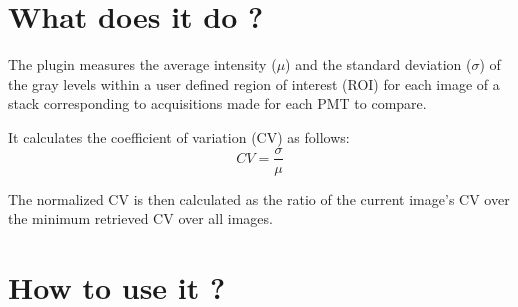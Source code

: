 \documentclass[a4paper, 11pt]{report}%
\begin{document}
\newpage

\section{What does it do ?}
\label{sec:gcvr-what}

\begin{enumerate*}
	\item The plugin measures the average intensity ($\mu$) and the standard deviation ($\sigma$) of the gray levels within a user defined region of interest (ROI) for each image of a stack corresponding to acquisitions made for each PMT to compare.
	\item It calculates the coefficient of variation (CV) as follows:
		\begin{equation}
			CV = \frac{\sigma}{\mu}
			\label{eqn:gcvr-CV}
		\end{equation}
	\item The normalized CV is then calculated as the ratio of the current image's CV over the minimum retrieved CV over all images.
\end{enumerate*}

\section{How to use it ?}
\label{sec:gcvr-how}
\end{document}
